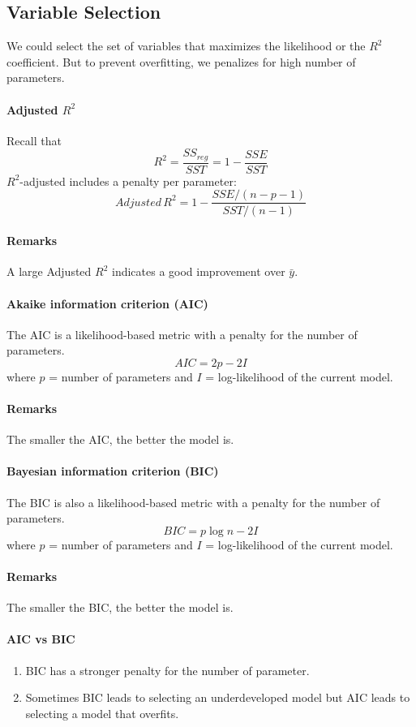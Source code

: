 \documentclass[11pt]{article}
\begin{document}
\subsection{Variable Selection}
We could select the set of variables that maximizes the likelihood or the $R^2$ coefficient. But to prevent overfitting, we penalizes for high number of parameters.
\paragraph{Adjusted $R^2$}
Recall that $$R^2 = \frac{SS_{reg}}{SST} = 1 - \frac{SSE}{SST}$$
$R^2$-adjusted includes a penalty per parameter:
$$Adjusted \, R^2 = 1 - \frac{SSE/(n-p-1)}{SST/(n-1)}$$
\paragraph{Remarks}
A large Adjusted $R^2$ indicates a good improvement over $\bar{y}$.

\paragraph{Akaike information criterion (AIC)}
The AIC is a likelihood-based metric with a penalty for the number of parameters.
$$AIC = 2p - 2I$$
where $p$ = number of parameters and $I$ = log-likelihood of the current model.
\paragraph{Remarks}
The smaller the AIC, the better the model is.
\paragraph{Bayesian information criterion (BIC)}
The BIC is also a likelihood-based metric with a penalty for the number of parameters.
$$BIC = p\log{n} - 2I$$
where $p$ = number of parameters and $I$ = log-likelihood of the current model.
\paragraph{Remarks}
The smaller the BIC, the better the model is.
\paragraph{AIC vs BIC}
\begin{enumerate}
	\item BIC has a stronger penalty for the number of parameter.
	\item Sometimes BIC leads to selecting an underdeveloped model but AIC leads to selecting a model that overfits.
\end{enumerate}
\end{document}
